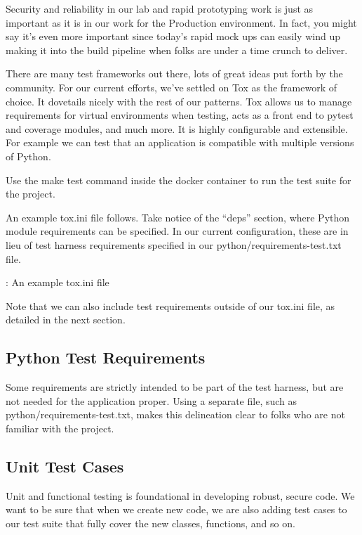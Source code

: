 \justify{}
Security and reliability in our lab and rapid prototyping work is just as important as it is in our work for the Production environment. 
In fact, you might say it's even more important since today's rapid mock ups
can easily wind up making it into the build pipeline when folks are under a time crunch to deliver.

\justify{}
There are many test frameworks out there, lots of great ideas put forth by the community. For our current
efforts, we've settled on Tox as the framework of choice. It dovetails nicely with the rest of
our patterns. Tox allows us to manage requirements for virtual environments when testing, acts as a front
end to pytest and coverage modules, and much more. It is highly configurable and extensible. For example
we can test that an application is compatible with multiple versions of Python.

\justify{}
Use the make test command inside the docker container to run the test suite for the project.

\justify{}
An example tox.ini file follows. Take notice of the ``deps'' section,
where Python module requirements can be specified. In our current configuration,
these are in lieu of test harness requirements specified in our
python/requirements-test.txt file.

\begin{mybox}{\thetcbcounter: An example tox.ini file}
	
\end{mybox}

\justify{}
Note that we can also include test requirements outside of our tox.ini file, as detailed
in the next section.

\subsection{Python Test Requirements}

\justify{}
Some requirements are strictly intended to be part of the test harness, but are not
needed for the application proper. Using a separate file, such as
python/requirements-test.txt, makes this delineation clear to folks who are not familiar with the project.

\subsection{Unit Test Cases}

\justify{}
Unit and functional testing is foundational in developing robust, secure
code. We want to be sure that when we create new code, we are also adding
test cases to our test suite that fully cover the new classes, functions, and so on.


